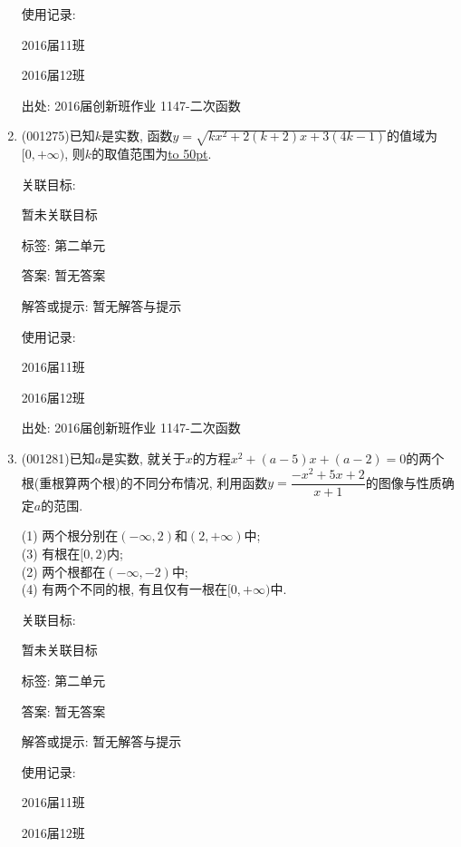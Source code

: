 \documentclass[10pt,a4paper]{article}
\newcommand{\blank}[1]{\underline{\hbox to #1pt{}}}
\begin{document}
\begin{enumerate}[1.]
使用记录:

2016届11班	

2016届12班	


出处: 2016届创新班作业	1147-二次函数
\item { (001275)}已知$k$是实数, 函数$y=\sqrt{kx^2+2(k+2)x+3(4k-1)}$的值域为$[0,+\infty)$, 则$k$的取值范围为\blank{50}.


关联目标:

暂未关联目标



标签: 第二单元

答案: 暂无答案

解答或提示: 暂无解答与提示

使用记录:

2016届11班	

2016届12班	


出处: 2016届创新班作业	1147-二次函数
\item { (001281)}已知$a$是实数, 就关于$x$的方程$x^2+(a-5)x+(a-2)=0$的两个根(重根算两个根)的不同分布情况, 利用函数$y=\dfrac{-x^2+5x+2}{x+1}$的图像与性质确定$a$的范围.\\ 
\begin{multicols}{2}
(1) 两个根分别在$(-\infty,2)$和$(2,+\infty)$中;\\ 
(3) 有根在$[0,2)$内;\\ 
(2) 两个根都在$(-\infty,-2)$中;\\ 
(4) 有两个不同的根, 有且仅有一根在$[0,+\infty)$中.\\ 
\end{multicols}


关联目标:

暂未关联目标



标签: 第二单元

答案: 暂无答案

解答或提示: 暂无解答与提示

使用记录:

2016届11班				

2016届12班				



\end{enumerate}
\end{document}
